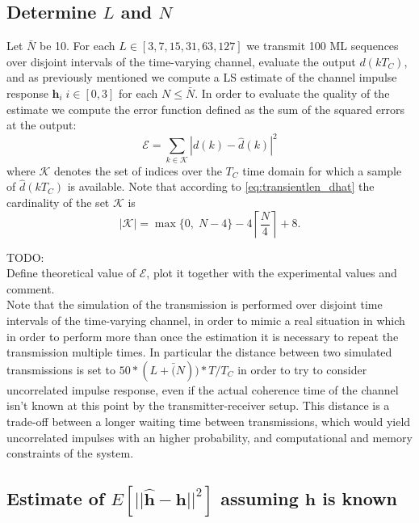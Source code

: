 \documentclass[10pt]{article}
\begin{document}
\subsection*{Determine $L$ and $N$}
Let $\bar{N}$ be 10. For each $L \in [3, 7, 15, 31, 63, 127]$ we transmit 100 ML sequences over disjoint intervals of the time-varying channel, evaluate the output $d(kT_C)$, and as previously mentioned we compute a LS estimate of the channel impulse response $\mathbf{h}_i \; i \in [0,3]$ for each $N \leq \bar{N}$. In order to evaluate the quality of the estimate we compute the error function defined as the sum of the squared errors at the output:
\begin{equation}
	\mathcal{E} = \sum_{k \in \mathcal{K}} |d(k)-\hat{d}(k)|^2
\end{equation}
where $\mathcal{K}$ denotes the set of indices over the $T_C$ time domain for which a sample of $\hat{d}(kT_C)$ is available. Note that according to \eqref{eq:transientlen_dhat} the cardinality of the set $\mathcal{K}$ is
\begin{equation}
|\mathcal{K}| = \max \{ 0, \; N-4 \} - 4 \left\lceil \frac{N}{4} \right\rceil + 8.
\end{equation}


TODO:\\
Define theoretical value of $\mathcal{E}$, plot it together with the experimental values and comment.\\
Note that the simulation of the transmission is performed over disjoint time intervals of the time-varying channel, in order to mimic a real situation in which in order to perform more than once the estimation it is necessary to repeat the transmission multiple times. In particular the distance between two simulated transmissions is set to $50*(L+\bar(N))*T/T_C$ in order to try to consider uncorrelated impulse response, even if the actual coherence time of the channel isn't known at this point by the transmitter-receiver setup. This distance is a trade-off between a longer waiting time between transmissions, which would yield uncorrelated impulses with an higher probability, and computational and memory constraints of the system.


\subsection*{Estimate of $E[||\mathbf{\hat{h}}-\mathbf{h}||^2]$ assuming $\mathbf{h}$ is known}
\end{document}
